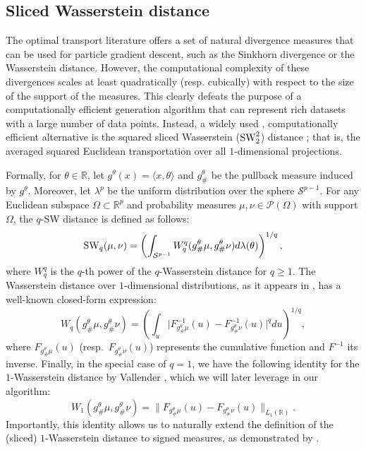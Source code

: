 \subsection{Sliced Wasserstein distance}
\label{sec:slicedwd}
The optimal transport literature offers a set of natural divergence measures that can be used for particle gradient descent, such as the Sinkhorn divergence or the Wasserstein distance. 
However, the computational complexity of these divergences scales at least quadratically (resp. cubically) with respect to the size of the support of the measures. This clearly defeats the purpose of a computationally efficient generation algorithm that can represent rich datasets with a large number of data points.
Instead, a widely used \citep{wu2019sliced, kolouri2018sliced, deshpande2018generative, deshpande2019max}, computationally efficient alternative is the squared sliced Wasserstein ($\text{SW}_2^2$) distance \citep{bonneel2015sliced}; that is, the averaged squared Euclidean transportation over all $1$-dimensional projections. 

Formally, for $\theta\in\mathbb{R}$, let $g^\theta(x) = \langle x, \theta\rangle$ and $g^\theta_{\#}$ be the pullback measure induced by $g^\theta$. Moreover, let $\lambda^p$ be the uniform distribution over the sphere $\mathcal S^{p-1}$. For any Euclidean subspace $\Omega \subset \mathbb{R}^p$ and probability measures $\mu, \nu \in \mathcal{P}(\Omega)$ with support $\Omega$,  the $q$-SW distance is defined as follows:
\begin{equation}
\label{eq:def_sliced_wasserstein}
    \text{SW}_q(\mu, \nu) =  \left(\int_{\mathcal S^{p -1}} W_q^q(g^\theta_{\#} \mu, g^\theta_{\#}\nu) d\lambda(\theta) \right)^{1/q}, 
\end{equation}
where 
$W_q^q$ is the $q$-th power of the $q$-Wasserstein distance for $q \geq 1$. The Wasserstein distance 
over $1$-dimensional distributions, as it appears in ,
has a well-known closed-form expression:
\begin{equation}
\label{eq:def_wasserstein}
    W_q(g^\theta_{\#} \mu, g^\theta_{\#}\nu)  = \left(\int_u \vert F^{-1}_{g^\theta_{\#} \mu}(u) - F^{-1}_{ g^\theta_{\#}\nu }(u)\vert^q du\right)^{1/q}, 
\end{equation}
 where $F_{g^\theta_{\#} \mu}(u)$ (resp.~$ F_{ g^\theta_{\#}\nu }(u)$) represents the cumulative  function and $F^{-1}$ its inverse. Finally, in the special case of $q=1$, we have the  following identity for the $1$-Wasserstein distance by Vallender \citep{vallander}, which we will later leverage in our algorithm:\begin{equation}\label{eq:vallander}
    W_1(g^\theta_{\#} \mu, g^\theta_{\#}\nu) = \| F_{g^\theta_{\#} \mu}(u) - F_{ g^\theta_{\#}\nu }(u)\|_{L_1(\mathbb R)}.
\end{equation}
Importantly, this identity allows us to naturally extend the definition of the (sliced) $1$-Wasserstein distance to signed measures, as demonstrated by \citet{boedihardjo2022private}.




